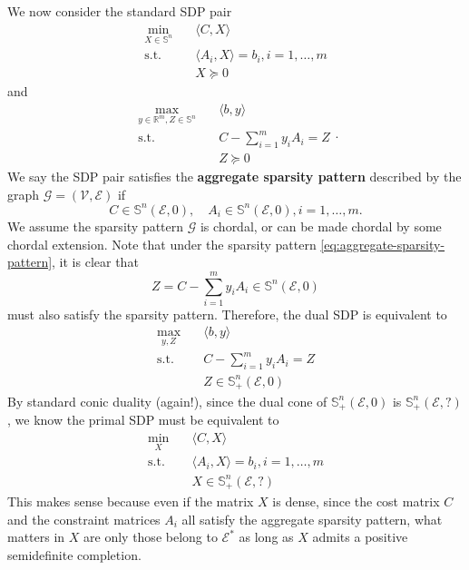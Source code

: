 \documentclass[
]{book}
\theoremstyle{definition}
\theoremstyle{definition}
\theoremstyle{definition}
\theoremstyle{definition}
\theoremstyle{remark}
\begin{document}
We now consider the standard SDP pair
\begin{equation}
\begin{split}
\min_{X \in \mathbb{S}^{n}} & \quad \langle C, X \rangle \\
\mathrm{s.t.}& \quad \langle A_i, X \rangle = b_i, i=1,\dots,m \\
& \quad X \succeq 0
\end{split}
\label{eq:primal-sdp-sparse}
\end{equation}
and
\begin{equation}
\begin{split}
\max_{y \in \mathbb{R}^{m}, Z \in \mathbb{S}^{n}} & \quad \langle b, y \rangle \\
\mathrm{s.t.}& \quad C - \sum_{i=1}^m y_i A_i = Z \\
& \quad Z \succeq 0
\end{split}.
\label{eq:dual-sdp-sparse}
\end{equation}
We say the SDP pair satisfies the \textbf{aggregate sparsity pattern} described by the graph \(\mathcal{G}=(\mathcal{V},\mathcal{E})\) if
\begin{equation}
C \in \mathbb{S}^{n}(\mathcal{E},0), \quad A_i \in \mathbb{S}^{n}(\mathcal{E},0), i=1,\dots,m.
\label{eq:aggregate-sparsity-pattern}
\end{equation}
We assume the sparsity pattern \(\mathcal{G}\) is chordal, or can be made chordal by some chordal extension. Note that under the sparsity pattern \eqref{eq:aggregate-sparsity-pattern}, it is clear that
\[
Z = C - \sum_{i=1}^m y_i A_i \in \mathbb{S}^{n}(\mathcal{E},0)
\]
must also satisfy the sparsity pattern. Therefore, the dual SDP is equivalent to
\begin{equation}
\boxed{
\begin{split}
\max_{y,Z} & \quad \langle b, y \rangle \\
\mathrm{s.t.}& \quad C - \sum_{i=1}^m y_i A_i = Z \\
& \quad Z \in \mathbb{S}^{n}_{+}(\mathcal{E},0)
\end{split}
}
\label{eq:dual-sdp-sparse-rewritten}
\end{equation}
By standard conic duality (again!), since the dual cone of \(\mathbb{S}^{n}_{+}(\mathcal{E},0)\) is \(\mathbb{S}^{n}_{+}(\mathcal{E},?)\), we know the primal SDP must be equivalent to
\begin{equation}
\boxed{
\begin{split}
\min_{X } & \quad \langle C, X \rangle \\
\mathrm{s.t.}& \quad \langle A_i, X \rangle = b_i, i=1,\dots,m \\
& \quad X \in \mathbb{S}^{n}_{+}(\mathcal{E},?)
\end{split}
}
\label{eq:primal-sdp-sparse-rewritten}
\end{equation}
This makes sense because even if the matrix \(X\) is dense, since the cost matrix \(C\) and the constraint matrices \(A_i\) all satisfy the aggregate sparsity pattern, what matters in \(X\) are only those belong to \(\mathcal{E}^*\) as long as \(X\) admits a positive semidefinite completion.
\end{document}
